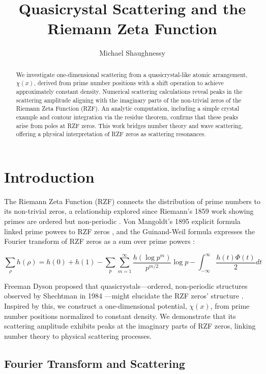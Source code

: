 \documentclass[11pt, oneside]{article}
\title{Quasicrystal Scattering and the Riemann Zeta Function}
\author{Michael Shaughnessy}
\begin{document}
\maketitle

\begin{abstract}
We investigate one-dimensional scattering from a quasicrystal-like atomic arrangement, $\chi(x)$, derived from prime number positions with a shift operation to achieve approximately constant density. Numerical scattering calculations reveal peaks in the scattering amplitude aligning with the imaginary parts of the non-trivial zeros of the Riemann Zeta Function (RZF). An analytic computation, including a simple crystal example and contour integration via the residue theorem, confirms that these peaks arise from poles at RZF zeros. This work bridges number theory and wave scattering, offering a physical interpretation of RZF zeros as scattering resonances.
\end{abstract}

\section{Introduction}

The Riemann Zeta Function (RZF) connects the distribution of prime numbers to its non-trivial zeros, a relationship explored since Riemann’s 1859 work showing primes are ordered but non-periodic \cite{Riemann1859}. Von Mangoldt’s 1895 explicit formula linked prime powers to RZF zeros \cite{VonMangoldt1895}, and the Guinand-Weil formula expresses the Fourier transform of RZF zeros as a sum over prime powers \cite{Weil}:

\begin{equation}
\sum_{\rho} h(\rho) = h(0) + h(1) - \sum_{p} \sum_{m=1}^{\infty} \frac{h(\log p^m)}{p^{m/2}} \log p - \int_{-\infty}^{\infty} \frac{h(t) \Phi(t)}{2} dt
\end{equation}

Freeman Dyson proposed that quasicrystals—ordered, non-periodic structures observed by Shechtman in 1984 \cite{Shechtman1984}—might elucidate the RZF zeros’ structure \cite{Baez2013}. Inspired by this, we construct a one-dimensional potential, $\chi(x)$, from prime number positions normalized to constant density. We demonstrate that its scattering amplitude exhibits peaks at the imaginary parts of RZF zeros, linking number theory to physical scattering processes.

\subsection{Fourier Transform and Scattering}
\end{document}
